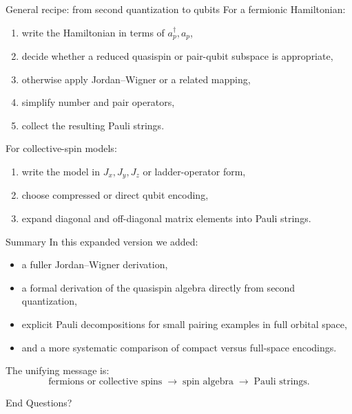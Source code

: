 \documentclass[aspectratio=169]{beamer}
\begin{document}
\begin{frame}{General recipe: from second quantization to qubits}
For a fermionic Hamiltonian:
\begin{enumerate}
\item write the Hamiltonian in terms of \(a_p^\dagger,a_p\),
\item decide whether a reduced quasispin or pair-qubit subspace is appropriate,
\item otherwise apply Jordan--Wigner or a related mapping,
\item simplify number and pair operators,
\item collect the resulting Pauli strings.
\end{enumerate}

For collective-spin models:
\begin{enumerate}
\item write the model in \(J_x,J_y,J_z\) or ladder-operator form,
\item choose compressed or direct qubit encoding,
\item expand diagonal and off-diagonal matrix elements into Pauli strings.
\end{enumerate}
\end{frame}

\begin{frame}{Summary}
In this expanded version we added:
\begin{itemize}
\item a fuller Jordan--Wigner derivation,
\item a formal derivation of the quasispin algebra directly from second quantization,
\item explicit Pauli decompositions for small pairing examples in full orbital space,
\item and a more systematic comparison of compact versus full-space encodings.
\end{itemize}

The unifying message is:
\[
\text{fermions or collective spins}
\;\longrightarrow\;
\text{spin algebra}
\;\longrightarrow\;
\text{Pauli strings}.
\]
\end{frame}

\begin{frame}{End}
\centering
{\Large Questions?}
\end{frame}
\end{document}
